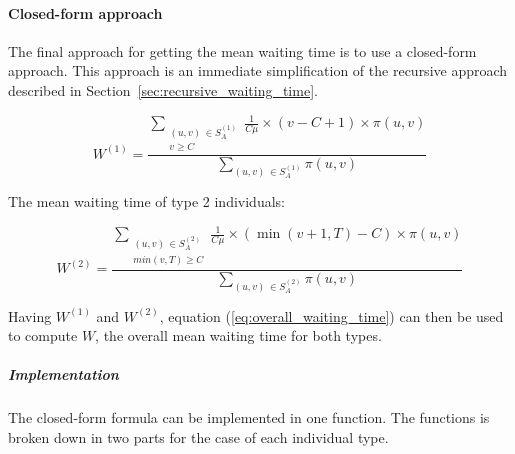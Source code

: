 \paragraph{Closed-form approach}\label{sec:closed_form_waiting_time}

The final approach for getting the mean waiting time is to use a closed-form
approach.
This approach is an immediate simplification of the recursive approach
described in Section~\ref{sec:recursive_waiting_time}.

\begin{equation} \label{eq:closed_form_waiting_type_1}
    W^{(1)} = \frac{\sum_{\substack{(u,v) \, \in S_A^{(1)} \\ v \geq C}}
    \frac{1}{C \mu} \times (v-C+1) \times \pi(u,v)}{\sum_{(u,v) \,
    \in S_A^{(1)}} \pi(u,v)}
\end{equation}

The mean waiting time of type 2 individuals:

\begin{equation}\label{eq:closed_form_waiting_type_2}
    W^{(2)} = \frac{\sum_{\substack{(u,v) \, \in S_A^{(2)} \\ min(v,T) \geq C}}
    \frac{1}{C \mu} \times (\min(v+1,T)-C) \times \pi(u,v)}{\sum_{(u,v) \,
    \in S_A^{(2)}} \pi(u,v)}
\end{equation}

Having \(W^{(1)}\) and \(W^{(2)}\), equation (\ref{eq:overall_waiting_time}) can
then be used to compute \(W\), the overall mean waiting time for both types.


\subparagraph{Implementation}\label{sec:waiting_closed_form_implementation}

The closed-form formula can be implemented in one function.
The functions is broken down in two parts for the case of each individual type.

